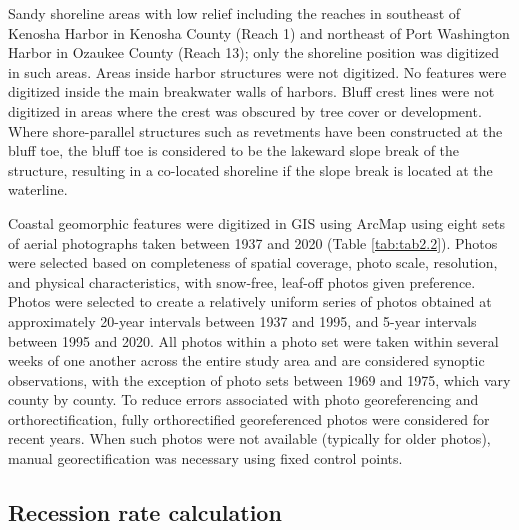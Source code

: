 Sandy shoreline areas with low relief including the reaches in southeast of
Kenosha Harbor in Kenosha County (Reach 1) and northeast of Port Washington
Harbor in Ozaukee County (Reach 13); only the shoreline position was digitized
in such areas. Areas inside harbor structures were not digitized.  No features
were digitized inside the main breakwater walls of harbors. Bluff crest lines
were not digitized in areas where the crest was obscured by tree cover or
development. Where shore-parallel structures such as revetments have been
constructed at the bluff toe, the bluff toe is considered to be the lakeward
slope break of the structure, resulting in a co-located shoreline if the slope
break is located at the waterline. 



Coastal geomorphic features were digitized in GIS using ArcMap using eight sets
of aerial photographs taken between 1937 and 2020 (Table \ref{tab:tab2.2}).
Photos were selected based on completeness of spatial coverage, photo scale,
resolution, and physical characteristics, with snow-free, leaf-off photos given
preference. Photos were selected to create a relatively uniform series of photos
obtained at approximately 20-year intervals between 1937 and 1995, and 5-year
intervals between 1995 and 2020. All photos within a photo set were taken within
several weeks of one another across the entire study area and are considered
synoptic observations,   with the exception of photo sets between 1969 and 1975,
which vary county by county. To reduce errors associated with photo
georeferencing and orthorectification, fully orthorectified georeferenced photos
were considered for recent years. When such photos were not available (typically
for older photos), manual georectification was necessary using fixed control
points. 


\subsection{Recession rate calculation} 
\label{Recession rate calculation}

